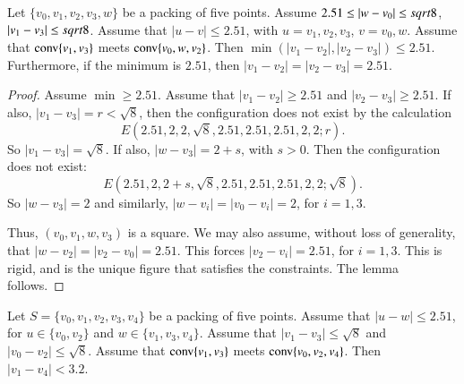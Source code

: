 \begin{tarskidata}
\begin{tarski}
%

\begin{lemma} 
Let $\{v_0,v_1,v_2,v_3,w\}$  be a packing of five points.
Assume $2.51\le|w-v_0|\le sqrt8$, $|v_1-v_3|\le sqrt8$.
Assume that $|u-v|\le 2.51$, with $u=v_1,v_2,v_3$,
$v=v_0,w$.
Assume that ${\operatorname{conv}}\{v_1,v_3\}$ meets ${\operatorname{conv}}\{v_0,w,v_2\}$.
Then
$\min(|v_1-v_2|,|v_2-v_3|)\le2.51$. Furthermore, if the minimum is
$2.51$, then $|v_1-v_2|=|v_2-v_3|=2.51$.
\end{lemma}


\begin{proof}
Assume $\min\ge2.51$.  Assume that $|v_1-v_2|\ge 2.51$ and $|v_2-v_3|\ge2.51$.
If also, $|v_1-v_3|=r<\sqrt8$, then the configuration does not
exist by the calculation
  $$
  E(2.51,2,2,\sqrt8,2.51,2.51,2.51,2,2; r).
  $$
So $|v_1-v_3|=\sqrt8$.
If also, $|w-v_3|=2+s$, with $s>0$.  
Then the configuration does not exist:
  $$
  E(2.51,2,2+s,\sqrt8,2.51,2.51,2.51,2,2;\sqrt8). 
  $$
So $|w-v_3|=2$ and similarly, $|w-v_i|=|v_0-v_i|=2$, for $i=1,3$.

Thus, $(v_0,v_1,w,v_3)$ is a square.
 We may also assume, without loss of generality, that
$|w-v_2|=|v_2-v_0|=2.51$. This forces $|v_2-v_i|=2.51$, for $i=1,3$.
This is rigid,  and is the unique figure that satisfies the
constraints. The lemma follows.
\end{proof}
\end{tarski}









\begin{tarski}

\begin{lemma}
Let $S=\{v_0,v_1,v_2,v_3,v_4\}$ be a packing of five points.
Assume that $|u-w|\le 2.51$, for
$u\in\{v_0,v_2\}$ and $w\in\{v_1,v_3,v_4\}$.
Assume that $|v_1-v_3|\le \sqrt8$ and $|v_0-v_2|\le\sqrt8$.
Assume that ${\operatorname{conv}}\{v_1,v_3\}$ meets ${\operatorname{conv}}\{v_0,v_2,v_4\}$.
Then $|v_1-v_4|< 3.2$.
\end{lemma}


\end{tarski}
\end{tarskidata}
